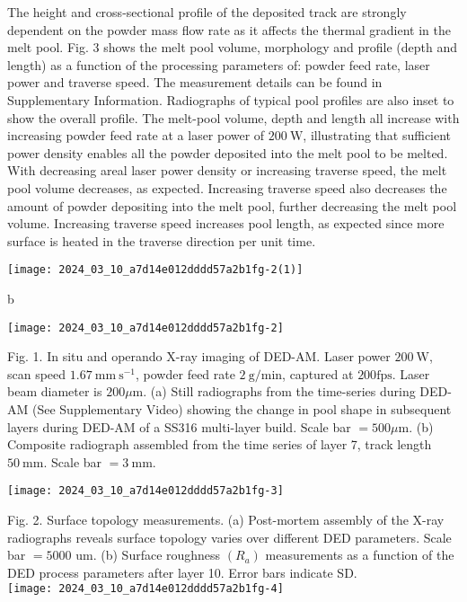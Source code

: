 \documentclass[10pt]{article}
\begin{document}
The height and cross-sectional profile of the deposited track are strongly dependent on the powder mass flow rate as it affects the thermal gradient in the melt pool. Fig. 3 shows the melt pool volume, morphology and profile (depth and length) as a function of the processing parameters of: powder feed rate, laser power and traverse speed. The measurement details can be found in Supplementary Information. Radiographs of typical pool profiles are also inset to show the overall profile. The melt-pool volume, depth and length all increase with increasing powder feed rate at a laser power of $200 \mathrm{~W}$, illustrating that sufficient power density enables all the powder deposited into the melt pool to be melted. With decreasing areal laser power density or increasing traverse speed, the melt pool volume decreases, as expected. Increasing traverse speed also decreases the amount of powder depositing into the melt pool, further decreasing the melt pool volume. Increasing traverse speed increases pool length, as expected since more surface is heated in the traverse direction per unit time.

\begin{center}
\texttt{[image: 2024\_03\_10\_a7d14e012dddd57a2b1fg-2(1)]}
\end{center}

b

\begin{center}
\texttt{[image: 2024\_03\_10\_a7d14e012dddd57a2b1fg-2]}
\end{center}

Fig. 1. In situ and operando X-ray imaging of DED-AM. Laser power $200 \mathrm{~W}$, scan speed $1.67 \mathrm{~mm} \mathrm{~s}^{-1}$, powder feed rate $2 \mathrm{~g} / \mathrm{min}$, captured at $200 \mathrm{fps}$. Laser beam diameter is $200 \mu \mathrm{m}$. (a) Still radiographs from the time-series during DED-AM (See Supplementary Video) showing the change in pool shape in subsequent layers during DED-AM of a SS316 multi-layer build. Scale bar $=500 \mu \mathrm{m}$. (b) Composite radiograph assembled from the time series of layer 7, track length $50 \mathrm{~mm}$. Scale bar $=3 \mathrm{~mm}$.

\begin{center}
\texttt{[image: 2024\_03\_10\_a7d14e012dddd57a2b1fg-3]}
\end{center}

Fig. 2. Surface topology measurements. (a) Post-mortem assembly of the X-ray radiographs reveals surface topology varies over different DED parameters. Scale bar $=5000$ um. (b) Surface roughness $\left(R_{a}\right)$ measurements as a function of the DED process parameters after layer 10. Error bars indicate SD.\\
\texttt{[image: 2024\_03\_10\_a7d14e012dddd57a2b1fg-4]}
\end{document}
